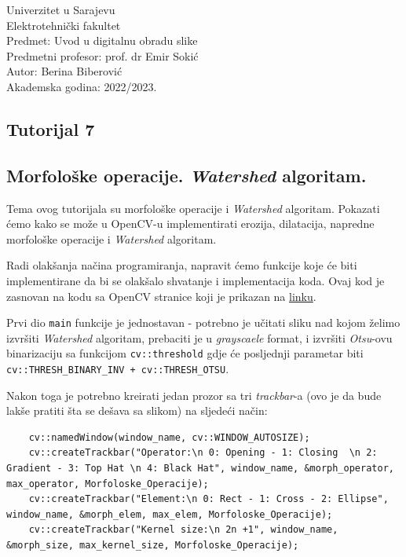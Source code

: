 \documentclass[a4paper, 12pt]{article}
\begin{document}
\noindent
Univerzitet u Sarajevu\\
Elektrotehnički fakultet\\
Predmet: Uvod u digitalnu obradu slike\\
Predmetni profesor: prof. dr Emir Sokić\\
Autor: Berina Biberović\\
Akademska godina: 2022/2023.


\begin{center}
    \section*{Tutorijal 7}
    \subsection*{Morfološke operacije. \textit{Watershed} algoritam.}
\end{center}

Tema ovog tutorijala su morfološke operacije i \textit{Watershed} algoritam. Pokazati ćemo kako se može u OpenCV-u implementirati erozija, dilatacija, napredne morfološke operacije i \textit{Watershed} algoritam.

Radi olakšanja načina programiranja, napravit ćemo funkcije koje će biti implementirane da bi se olakšalo shvatanje i implementacija koda. Ovaj kod je zasnovan na kodu sa OpenCV stranice koji je prikazan na \href{https://docs.opencv.org/4.x/d2/dbd/tutorial_distance_transform.html}{linku}.

Prvi dio \lstinline{main} funkcije je jednostavan - potrebno je učitati sliku nad kojom želimo izvršiti \textit{Watershed} algoritam, prebaciti je u \textit{grayscaele} format, i izvršiti \textit{Otsu}-ovu binarizaciju sa funkcijom \lstinline{cv::threshold} gdje će posljednji parametar biti \lstinline{cv::THRESH_BINARY_INV + cv::THRESH_OTSU}.

Nakon toga je potrebno kreirati jedan prozor sa tri \textit{trackbar}-a (ovo je da bude lakše pratiti šta se dešava sa slikom) na sljedeći način:

\begin{lstlisting}
    cv::namedWindow(window_name, cv::WINDOW_AUTOSIZE);
    cv::createTrackbar("Operator:\n 0: Opening - 1: Closing  \n 2: Gradient - 3: Top Hat \n 4: Black Hat", window_name, &morph_operator, max_operator, Morfoloske_Operacije);
    cv::createTrackbar("Element:\n 0: Rect - 1: Cross - 2: Ellipse", window_name, &morph_elem, max_elem, Morfoloske_Operacije);
    cv::createTrackbar("Kernel size:\n 2n +1", window_name, &morph_size, max_kernel_size, Morfoloske_Operacije);
\end{lstlisting}
\end{document}

